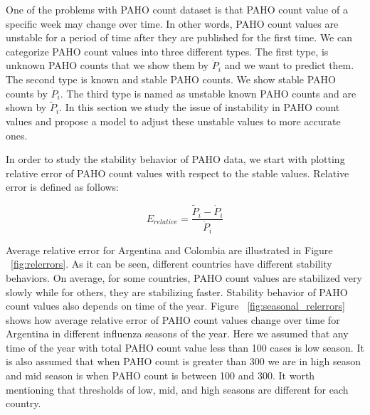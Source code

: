 
One of the problems with PAHO count dataset is that PAHO count value of a specific week may change over time. In other words, PAHO count values are unstable for a period of time after they are published for the first time. We can categorize PAHO count values into three different types. The first type, is unknown PAHO counts that we show them by $\ddot{P}_i$ and we want to predict them. The second type is known and stable PAHO counts. We show stable PAHO counts by $\dot{P}_i$. The third type is named as unstable known PAHO counts and are shown by $\tilde{P}_i$. In this section we study the issue of instability in PAHO count values and propose a model to adjust these unstable values to more accurate ones.

In order to study the stability behavior of PAHO data, we start with plotting relative error of PAHO count values with respect to the stable values. Relative error is defined as follows:

\begin{equation}
E_{relative} = \frac{\tilde{P}_i - \dot{P}_i}{\dot{P}_i}
\end{equation}

Average relative error for Argentina and Colombia are illustrated in Figure ~\ref{fig:relerrors}. As it can be seen, different countries have different stability behaviors. On average, for some countries, PAHO count values are stabilized very slowly while for others, they are stabilizing faster. Stability behavior of PAHO count values also depends on time of the year. Figure ~\ref{fig:seasonal_relerrors} shows how average relative error of PAHO count values change over time for Argentina in different influenza seasons of the year. Here we assumed that any time of the year with total PAHO count value less than 100 cases is low season. It is also assumed that when PAHO count is greater than 300 we are in high season and mid season is when PAHO count is between 100 and 300. It worth mentioning that thresholds of low, mid, and high seasons are different for each country.

